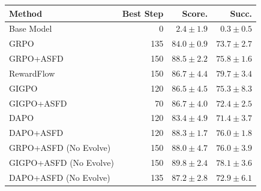 \begin{tabular}{lrrr}
\toprule
Method & Best Step & Score. & Succ. \\
\midrule
Base Model & 0 & $2.4 \pm 1.9$ & $0.3 \pm 0.5$ \\
GRPO & 135 & $84.0 \pm 0.9$ & $73.7 \pm 2.7$ \\
GRPO+ASFD & 150 & $88.5 \pm 2.2$ & $75.8 \pm 1.6$ \\
RewardFlow & 150 & $86.7 \pm 4.4$ & $79.7 \pm 3.4$ \\
GIGPO & 120 & $86.5 \pm 4.5$ & $75.3 \pm 8.3$ \\
GIGPO+ASFD & 70 & $86.7 \pm 4.0$ & $72.4 \pm 2.5$ \\
DAPO & 120 & $83.4 \pm 4.9$ & $71.4 \pm 3.7$ \\
DAPO+ASFD & 120 & $88.3 \pm 1.7$ & $76.0 \pm 1.8$ \\
GRPO+ASFD (No Evolve) & 150 & $88.0 \pm 4.7$ & $76.0 \pm 3.9$ \\
GIGPO+ASFD (No Evolve) & 150 & $89.8 \pm 2.4$ & $78.1 \pm 3.6$ \\
DAPO+ASFD (No Evolve) & 135 & $87.2 \pm 2.8$ & $72.9 \pm 6.1$ \\
\bottomrule
\end{tabular}
